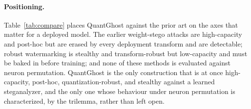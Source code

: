 \documentclass[10pt,journal]{IEEEtran}
\theoremstyle{remark}
\newcommand{\sys}{\mbox{QuantGhost}}
\begin{document}
\paragraph{Positioning.} Table~\ref{tab:compare} places \sys{} against the prior art on
the axes that matter for a deployed model. The earlier weight-stego attacks are
high-capacity and post-hoc but are erased by every deployment transform and are
detectable; robust watermarking is stealthy and transform-robust but low-capacity and
must be baked in before training; and none of these methods is evaluated against neuron
permutation. \sys{} is the only construction that is at once high-capacity, post-hoc,
quantization-robust, and stealthy against a learned steganalyzer, and the only one whose
behaviour under neuron permutation is characterized, by the trilemma, rather than left
open.
\end{document}
